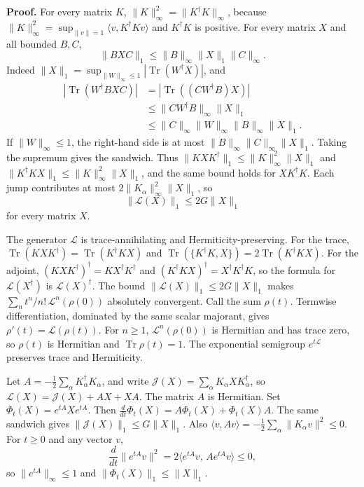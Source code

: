 \documentclass[
  11pt,
]{article}
\begin{document}
\textbf{Proof.} For every matrix \(K\),
\(\|K\|_\infty^2=\|K^\dagger K\|_\infty\), because
\(\|K\|_\infty^2=\sup_{\|v\|=1}\langle v,K^\dagger K v\rangle\) and
\(K^\dagger K\) is positive. For every matrix \(X\) and all bounded \(B,C\),
\[
\|BXC\|_1\le\|B\|_\infty\|X\|_1\|C\|_\infty.
\]
Indeed \(\|X\|_1=\sup_{\|W\|_\infty\le 1}|\operatorname{Tr}(W^\dagger X)|\),
and
\[
\begin{aligned}
|\operatorname{Tr}(W^\dagger BXC)|
&=|\operatorname{Tr}((CW^\dagger B)X)|\\
&\le\|CW^\dagger B\|_\infty\|X\|_1\\
&\le\|C\|_\infty\|W\|_\infty\|B\|_\infty\|X\|_1.
\end{aligned}
\]
If \(\|W\|_\infty\le 1\), the right-hand side is at most
\(\|B\|_\infty\|C\|_\infty\|X\|_1\). Taking the supremum gives the
sandwich. Thus \(\|KXK^\dagger\|_1\le\|K\|_\infty^2\|X\|_1\) and
\(\|K^\dagger KX\|_1\le\|K\|_\infty^2\|X\|_1\), and the same bound holds
for \(XK^\dagger K\). Each jump contributes at most
\(2\|K_\alpha\|_\infty^2\|X\|_1\), so
\[
\|\mathcal L(X)\|_1\le 2G\|X\|_1
\]
for every matrix \(X\).

The generator \(\mathcal L\) is trace-annihilating and Hermiticity-preserving. For the trace,
\(\operatorname{Tr}(KXK^\dagger)=\operatorname{Tr}(K^\dagger KX)\) and
\(\operatorname{Tr}(\{K^\dagger K,X\})=2\operatorname{Tr}(K^\dagger KX)\).
For the adjoint,
\((KXK^\dagger)^\dagger=KX^\dagger K^\dagger\) and
\((K^\dagger KX)^\dagger=X^\dagger K^\dagger K\), so the formula for
\(\mathcal L(X^\dagger)\) is \(\mathcal L(X)^\dagger\). The bound
\(\|\mathcal L(X)\|_1\le 2G\|X\|_1\) makes
\(\sum_n t^n/n!\,\mathcal L^n(\rho(0))\) absolutely convergent. Call the
sum \(\rho(t)\). Termwise differentiation, dominated by the same
scalar majorant, gives \(\rho'(t)=\mathcal L(\rho(t))\). For \(n\ge 1\),
\(\mathcal L^n(\rho(0))\) is Hermitian and has trace zero, so
\(\rho(t)\) is Hermitian and \(\operatorname{Tr}\rho(t)=1\). The exponential semigroup \(e^{t\mathcal L}\) preserves trace and Hermiticity.

Let \(A=-\tfrac12\sum_\alpha K_\alpha^\dagger K_\alpha\), and write
\(\mathcal J(X)=\sum_\alpha K_\alpha XK_\alpha^\dagger\), so
\(\mathcal L(X)=\mathcal J(X)+AX+XA\). The matrix \(A\) is Hermitian.
Set \(\Phi_t(X)=e^{tA}Xe^{tA}\). Then
\(\frac{d}{dt}\Phi_t(X)=A\Phi_t(X)+\Phi_t(X)A\).
The same sandwich gives
\(\|\mathcal J(X)\|_1\le G\|X\|_1\). Also
\(\langle v,Av\rangle=-\tfrac12\sum_\alpha\|K_\alpha v\|^2\le 0\).
For \(t\ge 0\) and any vector \(v\),
\[
\frac{d}{dt}\|e^{tA}v\|^2
=2\langle e^{tA}v,\,A e^{tA}v\rangle\le 0,
\]
so \(\|e^{tA}\|_\infty\le 1\) and \(\|\Phi_t(X)\|_1\le\|X\|_1\).
\end{document}
